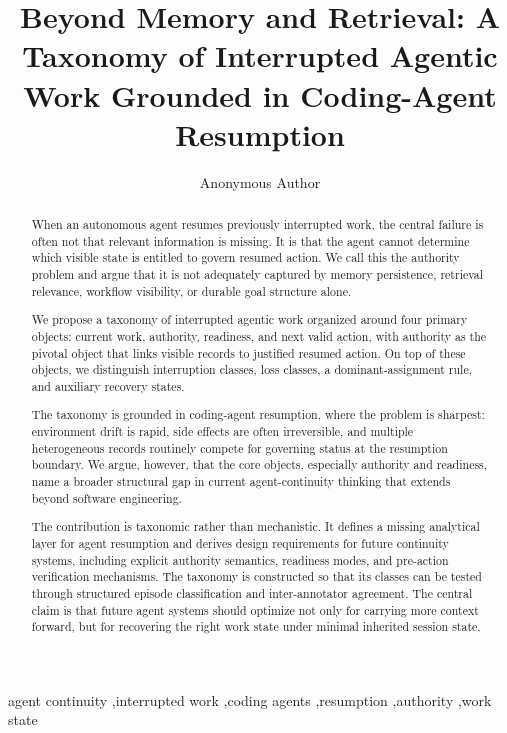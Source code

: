 \documentclass[a4paper,fleqn]{cas-sc}
\begin{document}
\let\WriteBookmarks\relax
\def\floatpagepagefraction{1}
\def\textpagefraction{.001}

\title[mode=title]{Beyond Memory and Retrieval: A Taxonomy of Interrupted Agentic Work Grounded in Coding-Agent Resumption}

\author[1]{Anonymous Author}

\begin{abstract}
When an autonomous agent resumes previously interrupted work, the central failure is often not that relevant information is missing. It is that the agent cannot determine which visible state is entitled to govern resumed action. We call this the authority problem and argue that it is not adequately captured by memory persistence, retrieval relevance, workflow visibility, or durable goal structure alone.

We propose a taxonomy of interrupted agentic work organized around four primary objects: current work, authority, readiness, and next valid action, with authority as the pivotal object that links visible records to justified resumed action. On top of these objects, we distinguish interruption classes, loss classes, a dominant-assignment rule, and auxiliary recovery states.

The taxonomy is grounded in coding-agent resumption, where the problem is sharpest: environment drift is rapid, side effects are often irreversible, and multiple heterogeneous records routinely compete for governing status at the resumption boundary. We argue, however, that the core objects, especially authority and readiness, name a broader structural gap in current agent-continuity thinking that extends beyond software engineering.

The contribution is taxonomic rather than mechanistic. It defines a missing analytical layer for agent resumption and derives design requirements for future continuity systems, including explicit authority semantics, readiness modes, and pre-action verification mechanisms. The taxonomy is constructed so that its classes can be tested through structured episode classification and inter-annotator agreement. The central claim is that future agent systems should optimize not only for carrying more context forward, but for recovering the right work state under minimal inherited session state.
\end{abstract}

\begin{keywords}
agent continuity \sep interrupted work \sep coding agents \sep resumption \sep authority \sep work state
\end{keywords}
\end{document}

